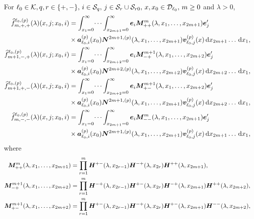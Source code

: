 \begin{lem}\label{lem: fhat}
	For \(\ell_0\in\mathcal K,q,r\in\{+,-\},\,i\in\mathcal{S}_q,\,j\in\mathcal{S}_r\cup\mathcal{S}_{r0},\,x,x_0\in\mathcal{D}_{\ell_0},\,m\geq 0\) and \(\lambda>0\),
	\begin{align*}
		\widehat f^{\ell_0,(p)}_{m,+,+}(\lambda)(  x, j; x_0,i)  &=\int_{x_1=0}^\infty \dots \int_{x_{2m+1}=0}^\infty \boldsymbol e_i\boldsymbol M^{m}_{++}(\lambda,x_1,\dots,x_{2m+1})\boldsymbol e_j'{} \nonumber 
		\\ &\times \boldsymbol a_{\ell_0,i}^{(p)}(x_0) \boldsymbol N^{2m+1,(p)}(\lambda,x_1,\dots,x_{2m+1}) {\boldsymbol v}_{\ell_0,j}^{(p)}( x)\, \mathrm{d} x_{2m+1}\dots\, \mathrm{d} x_1 ,
		\\ \widehat f^{\ell_0,(p)}_{m+1,-,+}(\lambda)(x, j; x_0,i) &= 
			\int_{x_1=0}^\infty \dots \int_{x_{2m+2}=0}^\infty \boldsymbol e_i\boldsymbol M^{m+1}_{-+}(\lambda,x_1,\dots,x_{2m+2})\boldsymbol e_j'{} \nonumber 
			\\&\times \boldsymbol a_{\ell_0,i}^{(p)}(x_0) \boldsymbol N^{2m+2,(p)}(\lambda,x_1,\dots,x_{2m+2}) {\boldsymbol v}_{\ell_0,j}^{(p)}( x)\, \mathrm{d} x_{2m+2}\dots\, \mathrm{d} x_1,
		\\ \widehat f^{\ell_0,(p)}_{m+1,+,-}(\lambda)(x, j; x_0,i) &= 
			\int_{x_1=0}^\infty \dots \int_{x_{2m+2}=0}^\infty \boldsymbol e_i\boldsymbol M^{m+1}_{+-}(\lambda,x_1,\dots,x_{2m+2})\boldsymbol e_j'{} \nonumber 
			\\&\times \boldsymbol a_{\ell_0,i}^{(p)}(x_0) \boldsymbol N^{2m+1,(p)}(\lambda,x_1,\dots,x_{2m+1}) {\boldsymbol v}_{\ell_0,j}^{(p)}( x)\, \mathrm{d} x_{2m+2}\dots\, \mathrm{d} x_1,
		\\ \widehat f^{\ell_0,(p)}_{m,-,-}(\lambda)(x, j; x_0,i) &= 
			\int_{x_1=0}^\infty \dots \int_{x_{2m+1}=0}^\infty \boldsymbol e_i\boldsymbol M^m_{--}(\lambda,x_1,\dots,x_{2m+1})\boldsymbol e_j'{} \nonumber 
			\\&\times \boldsymbol a_{\ell_0,i}^{(p)}(x_0) \boldsymbol N^{2m+1,(p)}(\lambda,x_1,\dots,x_{2m+1}) {\boldsymbol v}_{\ell_0,j}^{(p)}( x)\, \mathrm{d} x_{2m+1}\dots\, \mathrm{d} x_1,
	\end{align*}
	where
	\begin{align*}
			\bs M^{m}_{++}(\lambda,x_1,\dots,x_{2m+1}) \nonumber 
			&= \prod_{r=1}^{m}\bs H^{+-}(\lambda,x_{2r-1})\bs H^{-+}(\lambda,x_{2r})  
			\bs H^{++}(\lambda,x_{2m+1}),\nonumber 
			\\\bs M^{m+1}_{-+}(\lambda,x_1,\dots,x_{2m+2}) &= \prod_{r=1}^{m}\bs H^{-+}(\lambda,x_{2r-1})\bs H^{+-}(\lambda,x_{2r}) \bs H^{-+}(\lambda,x_{2m+1}) \bs H^{++}(\lambda,x_{2m+2}),
			\\\bs M^{m+1}_{+-}(\lambda,x_1,\dots,x_{2m+2}) &= \prod_{r=1}^{m}\bs H^{+-}(\lambda,x_{2r-1})\bs H^{-+}(\lambda,x_{2r}) \bs H^{+-}(\lambda,x_{2m+1}) \bs H^{--}(\lambda,x_{2m+2}),

\end{align*}
\end{lem}
